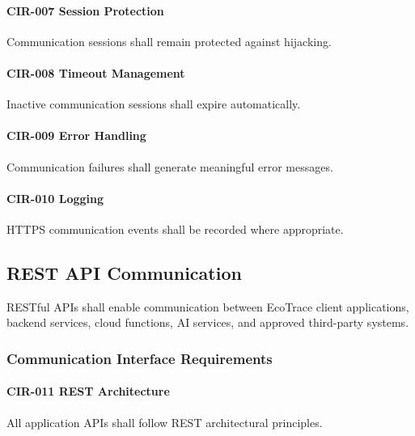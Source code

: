 \paragraph{CIR-007 Session Protection}

Communication sessions shall remain protected against hijacking.

\paragraph{CIR-008 Timeout Management}

Inactive communication sessions shall expire automatically.

\paragraph{CIR-009 Error Handling}

Communication failures shall generate meaningful error messages.

\paragraph{CIR-010 Logging}

HTTPS communication events shall be recorded where appropriate.


\subsection{REST API Communication}

RESTful APIs shall enable communication between EcoTrace client
applications, backend services, cloud functions, AI services, and
approved third-party systems.


\subsubsection*{Communication Interface Requirements}

\paragraph{CIR-011 REST Architecture}

All application APIs shall follow REST architectural principles.

